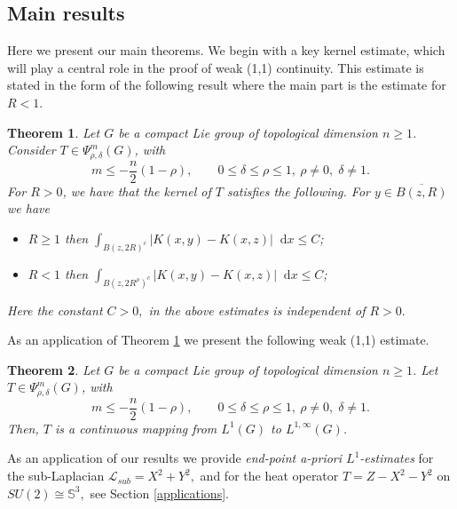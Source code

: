 \documentclass[12pt, reqno]{amsart}
\newtheorem{theorem}{Theorem}[section]
\theoremstyle{definition}
\theoremstyle{remark}
\numberwithin{equation}{section}
\newcommand*\diff{\mathop{}\!\mathrm{d}}
\begin{document}
\subsection{Main results}
  Here we present our main theorems. We begin with a key kernel estimate, which will play a central role in the proof of weak (1,1) continuity. This estimate is stated in the form of the following result where the main part is the estimate for $R<1$. 
 \begin{theorem}\label{kernel_estimates}
    Let $G$ be a compact Lie group of topological dimension $n\geq 1$. Consider $T\in\Psi^{m}_{\rho,\delta}(G)$, with \[
m \le -\frac{n}{2}(1-\rho),
\qquad 0 \le \delta \le \rho \le 1,\ \rho\neq0,\;\delta \neq 1.
\]
For $R>0$, we have that the kernel of $T$ satisfies the following. For $y\in\overline{B(z, R)}$ we have
    \begin{itemize}
        \item $R\geq 1$ then
        $\int_{B(z, 2R)^c}|K(x,y)-K(x,z)|\diff{x}\leq C$;
         \item $R<1$ then $\int_{B(z, 2R^{\rho})^c}|K(x,y)-K(x,z)|\diff{x}\leq C$;
    \end{itemize}
    Here the constant $C>0,$ in the above estimates is independent of $R>0.$
\end{theorem}
As an application of Theorem \ref{kernel_estimates} we present the following weak (1,1) estimate.
\begin{theorem}\label{weak}
    Let $G$ be a compact Lie group of topological dimension $n\geq 1$. Let $T\in\Psi^{m}_{\rho,\delta}(G)$, with \[
m \le -\frac{n}{2}(1-\rho),
\qquad 0 \le \delta \le \rho \le 1,\ \rho\neq0,\;\delta \neq 1.
\]
Then, $T$ is a continuous mapping from $L^1(G)$ to $L^{1,\infty}(G)$.
\end{theorem} 
As an application of our results we provide {\it end-point a-priori $L^1$-estimates} for the sub-Laplacian $\mathcal{L}_{sub}=X^2+Y^2,$ and for the heat operator $T=Z-X^2-Y^2$  on $SU(2)\cong \mathbb{S}^3,$ see Section \ref{applications}.
\end{document}
